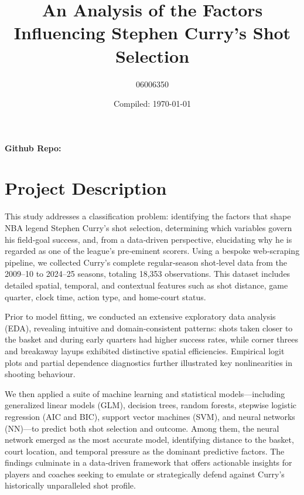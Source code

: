 \documentclass[a4paper, 12pt]{article}
\title{An Analysis of the Factors Influencing Stephen Curry's Shot Selection}
\author{06006350}
\date{Compiled: \today}
\begin{document}
\maketitle

\textbf{Github Repo:} \href{https://github.com/zakvarty/eds-notes-quarto/releases/tag/v1.2.0-alpha}{\color{blue}{REPLACE-WITH-LINK-TO-YOUR-TAGGED-RELEASE}}

\section{Project Description}


This study addresses a classification problem: identifying the factors that shape NBA legend Stephen Curry’s shot selection, determining which variables govern his field‑goal success, and, from a data‑driven perspective, elucidating why he is regarded as one of the league’s pre‑eminent scorers. Using a bespoke web‑scraping pipeline, we collected Curry’s complete regular‑season shot‑level data from the 2009–10 to 2024–25 seasons, totaling 18,353 observations. This dataset includes detailed spatial, temporal, and contextual features such as shot distance, game quarter, clock time, action type, and home‑court status. 

Prior to model fitting, we conducted an extensive exploratory data analysis (EDA), revealing intuitive and domain-consistent patterns: shots taken closer to the basket and during early quarters had higher success rates, while corner threes and breakaway layups exhibited distinctive spatial efficiencies. Empirical logit plots and partial dependence diagnostics further illustrated key nonlinearities in shooting behaviour. 

We then applied a suite of machine learning and statistical models—including generalized linear models (GLM), decision trees, random forests, stepwise logistic regression (AIC and BIC), support vector machines (SVM), and neural networks (NN)—to predict both shot selection and outcome. Among them, the neural network emerged as the most accurate model, identifying distance to the basket, court location, and temporal pressure as the dominant predictive factors. The findings culminate in a data‑driven framework that offers actionable insights for players and coaches seeking to emulate or strategically defend against Curry’s historically unparalleled shot profile.

\pagebreak
\end{document}
